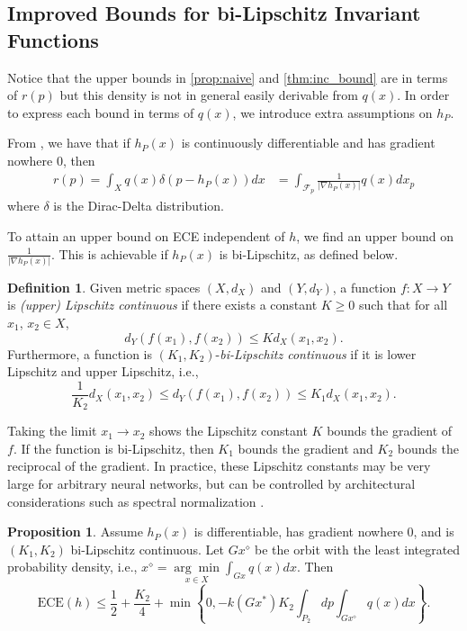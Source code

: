 \documentclass[10pt]{article} %
\theoremstyle{definition}
\newtheorem{proposition}{Proposition}
\newtheorem{defn}{Definition}
\newcommand{\ECE}{\mathrm{ECE}(h)}
\begin{document}
\subsection{Improved Bounds for bi-Lipschitz Invariant Functions}
Notice that the upper bounds in \cref{prop:naive} and \cref{thm:inc_bound} are in terms of $r(p)$ but this density is not in general easily derivable from $q(x)$. In order to express each bound in terms of $q(x)$, we introduce extra assumptions on $h_P$.

From \cite{hörmander2015analysis}, we have that if $h_P(x)$ is continuously differentiable and has gradient nowhere $0$, then
%
\begin{align}
  r(p) = \int_Xq(x)\delta(p - h_P(x))dx &= \int_{\mathcal{F}_p}\frac{1}{|\nabla h_P(x)|}q(x)dx_p \label{eq:reparam_density}
\end{align}
%
where $\delta$ is the Dirac-Delta distribution. 

To attain an upper bound on ECE independent of $h$, we find an upper bound on $\frac{1}{|\nabla h_P(x) |}$. This is achievable if $h_P(x)$ is bi-Lipschitz, as defined below. %

\begin{defn}
Given metric spaces $(X, d_X)$ and $(Y, d_Y)$, a function $f: X \to Y$ is \textit{(upper) Lipschitz continuous} if there exists a constant $K \geq 0$ such that for all $x_1$, $x_2 \in X$,  
\begin{equation*}
   d_Y(f(x_1), f(x_2))  \leq Kd_X(x_1, x_2).
\end{equation*}
Furthermore, a function is $(K_1, K_2)$-\textit{bi-Lipschitz continuous} if it is lower Lipschitz and upper Lipschitz, i.e.,  
\begin{equation*}
\frac{1}{K_2}d_X(x_1, x_2) \leq d_Y(f(x_1), f(x_2))  \leq K_1d_X(x_1, x_2).
\end{equation*}
\end{defn}

Taking the limit $x_1 \to x_2$ shows the Lipschitz constant $K$ bounds the gradient of $f$. If the function is bi-Lipschitz, then $K_1$ bounds the gradient and $K_2$ bounds the reciprocal of the gradient. In practice, these Lipschitz constants may be very large for arbitrary neural networks, but can be controlled by architectural considerations such as spectral normalization \citep[e.g.][]{behrmann2019invertible, chen2019residual}.

\begin{proposition}\label{prop:bilipschitzbounds}
Assume $h_P(x)$ is differentiable, has gradient nowhere $0$, and is $(K_1, K_2)$ bi-Lipschitz continuous. Let $Gx^\diamond$ be the orbit with the least integrated probability density, i.e., $x^\diamond = \underset{x \in X}{\arg \min} \int_{Gx}q(x)dx$. 
Then
\[
\ECE \leq \frac{1}{2} + \frac{K_2}{4} + \min \left\{ 0, - k(Gx^*)K_2\int_{P_2}dp\int_{Gx^\diamond}q(x)dx \right\}.
\]
\end{proposition}
\end{document}
